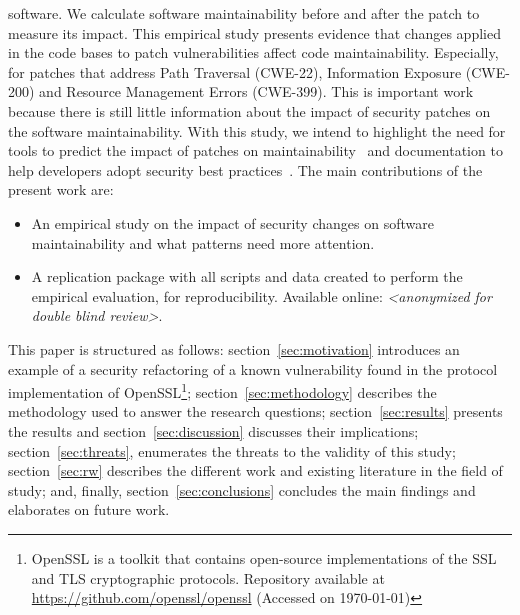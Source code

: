 \documentclass[10pt,conference]{IEEEtran}
\begin{document}
software. We calculate software maintainability before and after the patch to measure its 
impact. This empirical study presents evidence that changes 
applied in the code bases to patch vulnerabilities affect code maintainability. 
Especially, for patches that address Path Traversal (CWE-22),
Information Exposure (CWE-200) and Resource Management Errors (CWE-399). This is important work
because there is still little information about the impact of security patches on the software
maintainability. With this study, 
we intend to highlight the need for tools to predict the impact of patches on 
maintainability~\cite{4724577} and documentation to help developers adopt security 
best practices~\cite{6311252, 7927935, MESQUIDA201519}.
%
%
The main contributions of the present work are:
%
\begin{itemize}
	\item An empirical study on the impact of security changes on software
	maintainability and what patterns need more attention.
	\item A replication package with all scripts and data created to perform the
	empirical evaluation, for reproducibility. Available online:
  \textit{<anonymized for double blind review>}.
\end{itemize}
%
This paper is structured as follows: section~\ref{sec:motivation} introduces an
example of a security refactoring of a known vulnerability found in the
protocol implementation of OpenSSL\footnote{\label{openssl}OpenSSL is a toolkit that
contains open-source implementations of the SSL and TLS cryptographic
protocols. Repository available at \url{https://github.com/openssl/openssl}
(Accessed on \today{})}; section~\ref{sec:methodology} describes the
methodology used to answer the research questions; section~\ref{sec:results}
presents the results and section~\ref{sec:discussion} discusses their
implications; section~\ref{sec:threats}, enumerates the threats to the validity of
this study; section~\ref{sec:rw} describes the different work and existing
literature in the field of study; and, finally, section~\ref{sec:conclusions}
concludes the main findings and elaborates on future work.
%
\end{document}
